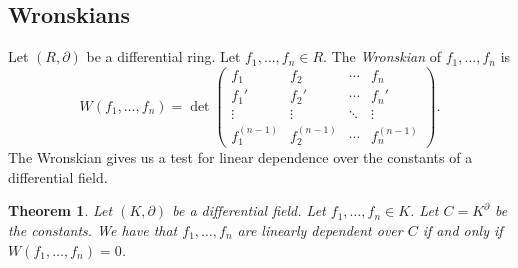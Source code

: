 \documentclass[12pt]{book}
\numberwithin{equation}{section}
\newtheorem{theorem}{Theorem}[subsection]
\theoremstyle{definition}
\theoremstyle{remark}
\begin{document}
\subsection{Wronskians}

Let $(R,\partial)$ be a differential ring. 
Let $f_1,\ldots,f_n\in R$. 
The \emph{Wronskian} of $f_1,\ldots,f_n$ is 
 $$ W(f_1,\ldots,f_n) = \det \begin{pmatrix}
 f_1 & f_2 & \cdots & f_n \\
 f_1' & f_2' & \cdots & f_n' \\
 \vdots & \vdots & \ddots & \vdots \\
 f_1^{(n-1)} & f_2^{(n-1)} & \cdots & f_n^{(n-1)}
 \end{pmatrix}.$$
The Wronskian gives us a test for linear dependence over the constants of a differential field. 
\begin{theorem}
	Let $(K,\partial)$ be a differential field. 
	Let $f_1,\ldots,f_n \in K$. 
	Let $C = K^{\partial}$ be the constants. 
	We have that $f_1,\ldots,f_n$ are linearly dependent over $C$ if and only if $W(f_1,\ldots,f_n)=0$. 
\end{theorem}
\end{document}
